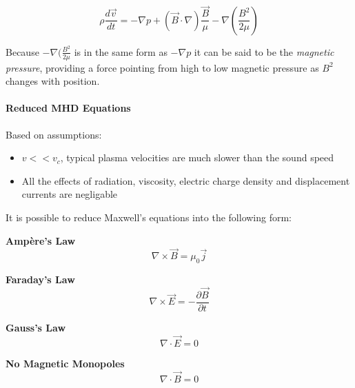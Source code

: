 \begin{equation}\label{maghydstat}
\rho\frac{d\vec{v}}{dt}= -\nabla p + (\vec{B}\cdot\nabla)\frac{\vec{B}}{\mu}-\nabla(\frac{B^2}{2\mu}) 
\end{equation}

Because $-\nabla(\frac{B^2}{2\mu}$ is in the same form as $-\nabla p$ it can be said to be the \emph{magnetic pressure}, providing a force pointing from high to low magnetic pressure as $B^2$ changes with position.

\paragraph{Reduced MHD Equations}
Based on assumptions:
\begin{itemize}
\item $v<<v_{c}$, typical plasma velocities are much slower than the sound speed 
\item All the effects of radiation, viscosity, electric charge density and displacement currents are negligable 
\end{itemize}
It is possible to reduce Maxwell's equations into the following form:

\textbf{Ampère's Law}
\begin{equation}\label{max1:ampere}
\nabla\times\vec{B}=\mu_{0}\vec{j}
\end{equation}

\textbf{Faraday's Law}
\begin{equation}\label{max2:faraday}
\nabla\times\vec{E}=-\frac{\partial \vec{B}}{\partial t}
\end{equation}

\textbf{Gauss's Law}
\begin{equation}\label{max3:gauss}
\nabla\cdot\vec{E}=0
\end{equation}

\textbf{No Magnetic Monopoles}
\begin{equation}\label{max4:nomonopole}
\nabla\cdot\vec{B}=0
\end{equation}

